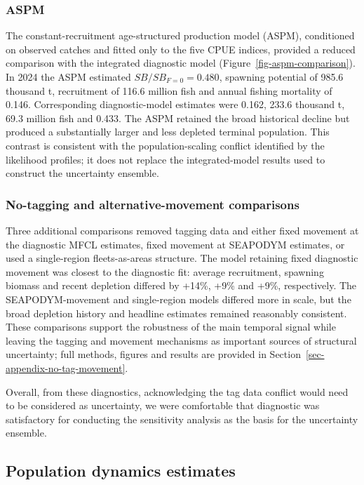 \documentclass[
  english,
  a4paper,
  a4paper,
  11pt]{SCreport}
\begin{document}
\subsubsection{ASPM}\label{sec-aspm}

The constant-recruitment age-structured production model (ASPM),
conditioned on observed catches and fitted only to the five CPUE
indices, provided a reduced comparison with the integrated diagnostic
model (Figure~\ref{fig-aspm-comparison}). In 2024 the ASPM estimated
\(SB/SB_{F=0}=0.480\), spawning potential of 985.6 thousand t,
recruitment of 116.6 million fish and annual fishing mortality of 0.146.
Corresponding diagnostic-model estimates were 0.162, 233.6 thousand t,
69.3 million fish and 0.433. The ASPM retained the broad historical
decline but produced a substantially larger and less depleted terminal
population. This contrast is consistent with the population-scaling
conflict identified by the likelihood profiles; it does not replace the
integrated-model results used to construct the uncertainty ensemble.

\subsubsection{No-tagging and alternative-movement
comparisons}\label{sec-no-tag-movement-results}

Three additional comparisons removed tagging data and either fixed
movement at the diagnostic MFCL estimates, fixed movement at SEAPODYM
estimates, or used a single-region fleets-as-areas structure. The model
retaining fixed diagnostic movement was closest to the diagnostic fit:
average recruitment, spawning biomass and recent depletion differed by
+14\%, +9\% and +9\%, respectively. The SEAPODYM-movement and
single-region models differed more in scale, but the broad depletion
history and headline estimates remained reasonably consistent. These
comparisons support the robustness of the main temporal signal while
leaving the tagging and movement mechanisms as important sources of
structural uncertainty; full methods, figures and results are provided
in Section~\ref{sec-appendix-no-tag-movement}.

Overall, from these diagnostics, acknowledging the tag data conflict
would need to be considered as uncertainty, we were comfortable that
diagnostic was satisfactory for conducting the sensitivity analysis as
the basis for the uncertainty ensemble.

\subsection{Population dynamics
estimates}\label{population-dynamics-estimates}
\end{document}

